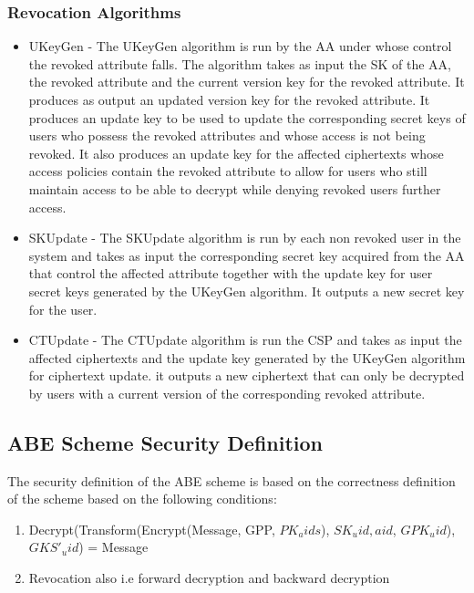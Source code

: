 \subsubsection*{Revocation Algorithms}
\begin{itemize}
	\item UKeyGen - The UKeyGen algorithm is run by the AA under whose control the revoked attribute falls. The algorithm takes as input the SK of the AA, the revoked attribute and the current version key for the revoked attribute. It produces as output an updated version key for the revoked attribute. It produces an update key to be used to update the corresponding secret keys of users who possess the revoked attributes and whose access is not being revoked. It also produces an update key for the affected ciphertexts whose access policies contain the revoked attribute to allow for users who still maintain access to be able to decrypt while denying revoked users further access.
	
	\item SKUpdate - The SKUpdate algorithm is run by each non revoked user in the system and takes as input the corresponding secret key acquired from the AA that control the affected attribute together with the update key for user secret keys generated by the UKeyGen algorithm. It outputs a new secret key for the user.
	
	\item CTUpdate - The CTUpdate algorithm is run the CSP and takes as input the affected ciphertexts and the update key generated by the UKeyGen algorithm for ciphertext update. it outputs a new ciphertext that can only be decrypted by users with a current version of the corresponding revoked attribute.
	
\end{itemize}

\subsection{ABE Scheme Security Definition}

The security definition of the ABE scheme is based on the correctness definition of the scheme based on the following conditions:

\begin{enumerate}[label=(\arabic*)]
	\item Decrypt(Transform(Encrypt(Message, GPP, $PK_aids$), $SK_uid,aid$, $GPK_uid$), $GKS'_uid$) = Message
	
	\item Revocation also i.e forward decryption and backward decryption
\end{enumerate}


